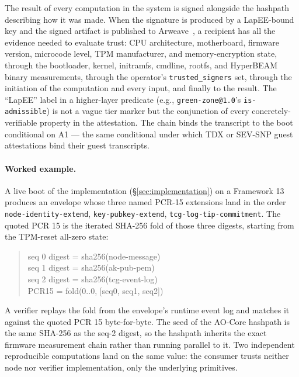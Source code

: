 \documentclass[10pt,a4paper]{article}
\begin{document}
The result of every computation in the system is signed alongside the
hashpath describing how it was made. When the signature is produced by a
LapEE-bound key and the signed artifact is published to
Arweave~\cite{arweave}, a recipient has all the evidence needed to evaluate
trust: CPU architecture, motherboard, firmware version, microcode level,
TPM manufacturer, and memory-encryption state, through the bootloader,
kernel, initramfs, cmdline, rootfs, and HyperBEAM binary measurements,
through the operator's \texttt{trusted\_signers} set, through the
initiation of the computation and every input, and finally to the result.
The ``LapEE'' label in a higher-layer predicate (e.g.,
\texttt{green-zone@1.0}'s \texttt{is-admissible}) is not a vague tier
marker but the conjunction of every concretely-verifiable property in the
attestation. The chain binds the transcript to the boot conditional on A1
--- the same conditional under which TDX or SEV-SNP guest attestations
bind their guest transcripts.

\paragraph{Worked example.} A live boot of the implementation
(\S\ref{sec:implementation}) on a Framework 13 produces an envelope
whose three named PCR-15 extensions land in the order
\texttt{node-identity-extend}, \texttt{key-pubkey-extend},
\texttt{tcg-log-tip-commitment}. The quoted PCR 15 is the iterated
SHA-256 fold of those three digests, starting from the TPM-reset
all-zero state:
\begin{quote}\footnotesize\ttfamily
seq 0  digest = sha256(node-message)\\
seq 1  digest = sha256(ak-pub-pem)\\
seq 2  digest = sha256(tcg-event-log)\\
PCR15  = fold(0..0, [seq0, seq1, seq2])
\end{quote}
A verifier replays the fold from the envelope's runtime event log and
matches it against the quoted PCR 15 byte-for-byte. The seed of the
AO-Core hashpath is the same SHA-256 as the seq-2 digest, so the
hashpath inherits the exact firmware measurement chain rather than
running parallel to it. Two independent reproducible computations land
on the same value: the consumer trusts neither node nor verifier
implementation, only the underlying primitives.
\end{document}
